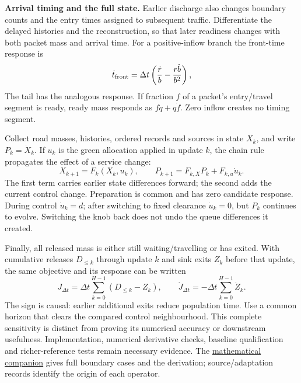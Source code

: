 \documentclass[10pt,a4paper]{article}
\begin{document}
\textbf{Arrival timing and the full state.} Earlier discharge also changes
boundary counts and the entry times assigned to subsequent traffic.
Differentiate the delayed histories and the reconstruction, so that
later readiness changes with both packet mass and arrival time.
For a positive-inflow branch the front-time response is
\begin{equation}
 \dot t_{\rm front}
 =\Delta t\left(\frac{\dot r}{b}-\frac{r\dot b}{b^2}\right),
 \label{eq:compact-entry-derivative}
\end{equation}
The tail has the analogous response. If fraction $f$ of a packet's
entry/travel segment is ready, ready mass responds as
$f\dot q+q\dot f$. Zero inflow creates no timing segment.

Collect road masses, histories, ordered records and sources in state
$X_k$, and write $P_k=\dot X_k$. If $u_k$ is the green allocation applied
in update $k$, the chain rule propagates the effect of a service change:
\begin{equation}
 X_{k+1}=F_k(X_k,u_k),\qquad
 P_{k+1}=F_{k,X}P_k+F_{k,u}\dot u_k .
 \label{eq:compact-chain}
\end{equation}
The first term carries earlier state differences forward; the second
adds the current control change. Preparation is common and has zero
candidate response. During control $\dot u_k=d$; after switching to fixed
clearance $\dot u_k=0$, but $P_k$ continues to evolve. Switching the knob
back does not undo the queue differences it created.

Finally, all released mass is either still waiting/travelling or has
exited. With cumulative releases $D_{\leq k}$ through update $k$ and
sink exits $Z_k$ before that update, the same objective and its response
can be written
\begin{equation}
 J_{\Delta t}=\Delta t\sum_{k=0}^{H-1}(D_{\leq k}-Z_k),
 \qquad
 \dot J_{\Delta t}=-\Delta t\sum_{k=0}^{H-1}\dot Z_k .
 \label{eq:compact-objective-derivative}
\end{equation}
The sign is causal: earlier additional exits reduce population time.
Use a common horizon that clears the compared control neighbourhood.
This complete sensitivity is distinct from proving its numerical accuracy
or downstream usefulness. Implementation, numerical derivative checks,
baseline qualification and richer-reference tests remain necessary evidence.
The \href{urban_methodology_specification.pdf}{mathematical companion}
gives full boundary cases and the derivation; source/adaptation records
identify the origin of each operator.
\end{document}
